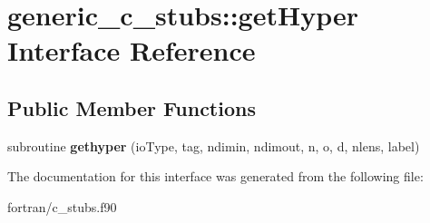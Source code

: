 \hypertarget{interfacegeneric__c__stubs_1_1get_hyper}{}\section{generic\+\_\+c\+\_\+stubs\+:\+:get\+Hyper Interface Reference}
\label{interfacegeneric__c__stubs_1_1get_hyper}
\subsection*{Public Member Functions}
\begin{DoxyCompactItemize}
\item 
\mbox{\label{interfacegeneric__c__stubs_1_1get_hyper_a9675ecd1c96575de00451dc9eec3454b}} 
subroutine {\bfseries gethyper} (io\+Type, tag, ndimin, ndimout, n, o, d, nlens, label)
\end{DoxyCompactItemize}


The documentation for this interface was generated from the following file\+:\begin{DoxyCompactItemize}
\item 
fortran/c\+\_\+stubs.\+f90\end{DoxyCompactItemize}
